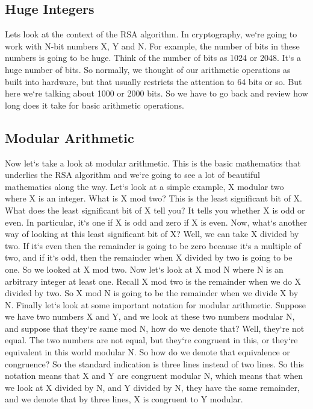 \subsection{Huge Integers}
Lets look at the context of the RSA algorithm.
In cryptography, we`re going to work with N-bit numbers X, Y and N\@.
For example, the number of bits in these numbers is going to be huge.
Think of the number of bits as 1024 or 2048.
It`s a huge number of bits.
So normally, we thought of our arithmetic operations as built into hardware, but that usually restricts the attention to 64 bits or so.
But here we`re talking about 1000 or 2000 bits.
So we have to go back and review how long does it take for basic arithmetic operations.

\subsection{Modular Arithmetic}
Now let`s take a look at modular arithmetic.
This is the basic mathematics that underlies the RSA algorithm and we`re going to see a lot of beautiful mathematics along the way.
Let`s look at a simple example, X modular two where X is an integer.
What is X mod two? This is the least significant bit of X\@.
What does the least significant bit of X tell you? It tells you whether X is odd or even.
In particular, it`s one if X is odd and zero if X is even.
Now, what`s another way of looking at this least significant bit of X? Well, we can take X divided by two.
If it`s even then the remainder is going to be zero because it`s a multiple of two, and if it`s odd, then the remainder when X divided by two is going to be one.
So we looked at X mod two.
Now let`s look at X mod N where N is an arbitrary integer at least one.
Recall X mod two is the remainder when we do X divided by two.
So X mod N is going to be the remainder when we divide X by N\@.
Finally let`s look at some important notation for modular arithmetic.
Suppose we have two numbers X and Y, and we look at these two numbers modular N, and suppose that they`re same mod N, how do we denote that? Well, they`re not equal.
The two numbers are not equal, but they`re congruent in this, or they`re equivalent in this world modular N\@.
So how do we denote that equivalence or congruence? So the standard indication is three lines instead of two lines.
So this notation means that X and Y are congruent modular N, which means that when we look at X divided by N, and Y divided by N, they have the same remainder, and we denote that by three lines, X is congruent to Y modular.

